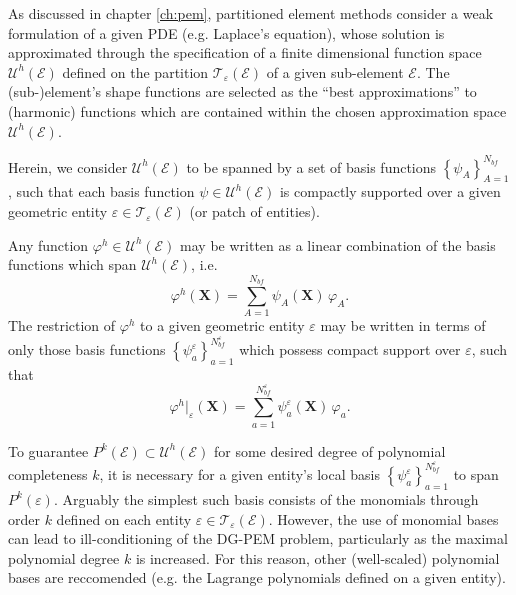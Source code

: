 		As discussed in chapter \ref{ch:pem}, partitioned element methods consider a weak formulation of a given PDE (e.g. Laplace's equation), whose solution is approximated through the specification of a finite dimensional function space $\mathcal{U}^h (\mathcal{E})$ defined on the partition $\mathcal{T}_{\varepsilon} (\mathcal{E})$ of a given sub-element $\mathcal{E}$. The (sub-)element's shape functions are selected as the ``best approximations'' to (harmonic) functions which are contained within the chosen approximation space $\mathcal{U}^h (\mathcal{E})$.
		
		Herein, we consider $\mathcal{U}^h (\mathcal{E})$ to be spanned by a set of basis functions $\left\{ \psi_A \right\}_{A=1}^{N_{bf}}$, such that each basis function $\psi \in \mathcal{U}^h (\mathcal{E})$ is compactly supported over a given geometric entity $\varepsilon \in \mathcal{T}_\varepsilon (\mathcal{E})$ (or patch of entities).
		
		Any function $\varphi^h \in \mathcal{U}^h (\mathcal{E})$ may be written as a linear combination of the basis functions which span $\mathcal{U}^h (\mathcal{E})$, i.e.
		\begin{equation}
			\varphi^h (\mathbf{X}) = \sum_{A=1}^{N_{bf}} \psi_A (\mathbf{X}) \, \varphi_A.
		\end{equation}
		The restriction of $\varphi^h$ to a given geometric entity $\varepsilon$ may be written in terms of only those basis functions $\left\{ \psi^\varepsilon_a \right\}_{a=1}^{N^\varepsilon_{bf}}$ which possess compact support over $\varepsilon$, such that
		\begin{equation}
			\varphi^h|_\varepsilon (\mathbf{X}) = \sum_{a=1}^{N^\varepsilon_{bf}} \psi^\varepsilon_a (\mathbf{X}) \, \varphi_a.
		\end{equation}
		
		To guarantee $P^k (\mathcal{E}) \subset \mathcal{U}^h (\mathcal{E})$ for some desired degree of polynomial completeness $k$, it is necessary for a given entity's local basis $\left\{ \psi^\varepsilon_a \right\}_{a=1}^{N^\varepsilon_{bf}}$ to span $P^k (\varepsilon)$. Arguably the simplest such basis consists of the monomials through order $k$ defined on each entity $\varepsilon \in \mathcal{T}_\varepsilon (\mathcal{E})$. However, the use of monomial bases can lead to ill-conditioning of the DG-PEM problem, particularly as the maximal polynomial degree $k$ is increased. For this reason, other (well-scaled) polynomial bases are reccomended (e.g. the Lagrange polynomials defined on a given entity).
		
